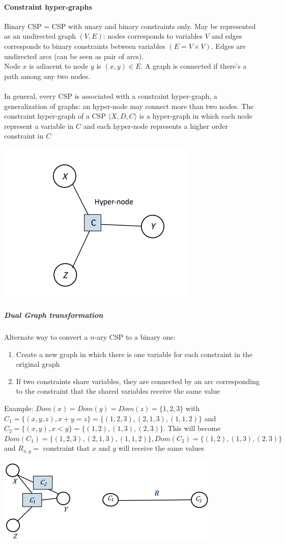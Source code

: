 \documentclass[10pt]{report}
\begin{document}
\paragraph{Constraint hyper-graphs} Binary CSP = CSP with unary and binary constraints only. May be represented as an undirected graph $(V, E)$: nodes corresponds to variables $V$ and edges corresponds to binary constraints between variables $(E = V\times V)$. Edges are undirected arcs (can be seen as pair of arcs).\\
Node $x$ is adiacent to node $y$ is $(x, y)\in E$. A graph is connected if there's a path among any two nodes.\\\\
In general, every CSP is associated with a constraint hyper-graph, a generalization of graphs: an hyper-node may connect more than two nodes. The constraint hyper-graph of a CSP $\langle X, D, C\rangle$ is a hyper-graph in which each node represent a variable in $C$ and each hyper-node represents a higher order constraint in $C$
\begin{center}
	\includegraphics[scale=0.75]{5.png}
\end{center}
\subparagraph{Dual Graph transformation} Alternate way to convert a $n$-ary CSP to a binary one:
\begin{enumerate}
	\item Create a new graph in which there is one variable for each constraint in the original graph
	\item If two constraints share variables, they are connected by an arc corresponding to the constraint that the shared variables receive the same value
\end{enumerate}
Example: $Dom(x) = Dom(y) = Dom(z) = \{1,2,3\}$ with $C_1 = \{(x,y,z), x + y = z\} = \{(1,2,3), (2,1,3), (1,1,2)\}$ and $C_2 = \{(x,y), x < y\} = \{(1,2), (1,3), (2,3)\}$.
This will become $Dom(C_1) = \{(1,2,3), (2,1,3), (1,1,2)\}, Dom(C_2)=\{(1,2), (1,3), (2,3)\}$ and $R_{x,y} =$ constraint that $x$ and $y$ will receive the same values
\begin{center}
	\includegraphics[scale=0.75]{6.png}
\end{center}
\end{document}
